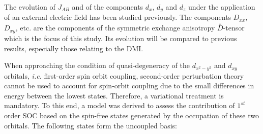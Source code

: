 \documentclass[12pt,a4paper]{report}
\numberwithin{equation}{section}
\begin{document}
\begin{center}
\end{center}
The evolution of $J_{AB}$ and of the components $d_x$, $d_y$ and $d_z$ under the application of an external electric field has been studied previously.
The components $D_{xx}$, $D_{xy}$, etc. are the components of the symmetric exchange anisotropy $\overline{\overline{D}}$-tensor which is the focus of this study.
Its evolution will be compared to previous results, especially those relating to the DMI.

When approaching the condition of quasi-degeneracy of the $d_{x^2-y^2}$ and $d_{xy}$ orbitals, \textit{i.e.} first-order spin orbit coupling, second-order perturbation theory cannot be used to account for spin-orbit coupling due to the small differences in energy between the lowest states.
Therefore, a variational treatment is mandatory.
To this end, a model was derived to assess the contribution of $1^{st}$ order SOC based on the spin-free states generated by the occupation of these two orbitals.
The following states form the uncoupled basis:
\end{document}
